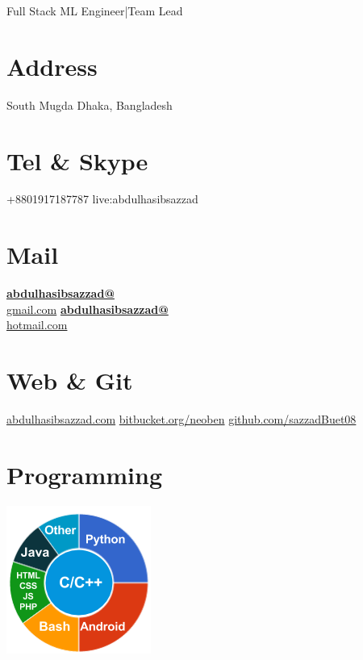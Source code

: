 \documentclass[]{friggeri-cv}
\begin{document}
      {Full Stack ML Engineer|Team Lead}
      

\begin{aside}
  \section{Address}
    South Mugda
    Dhaka, Bangladesh
    ~
  \section{Tel \& Skype}
    +8801917187787
    live:abdulhasibsazzad
    ~
  \section{Mail}
    \href{mailto:abdulhasibsazzad@gmail.com}{\textbf{abdulhasibsazzad@}\\gmail.com}
    \href{mailto:abdulhasibsazzad@.hotmail.com}{\textbf{abdulhasibsazzad@}\\hotmail.com}
    ~
  \section{Web \& Git}
    \href{http://www.abdulhasibsazzad.com}{abdulhasibsazzad.com}
    \href{https://bitbucket.org/neoben}{bitbucket.org/neoben}
    \href{https://github.com/sazzadBuet08}{github.com/sazzadBuet08}
    ~
  \section{Programming}
    \includegraphics[scale=0.62]{img/programming.png}
    ~

\end{aside}
\end{document}
